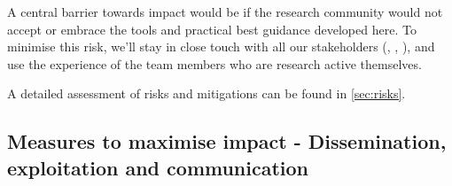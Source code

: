 A central barrier towards impact would be if the research community would not
accept or embrace the tools and practical best guidance developed here. To
minimise this risk, we'll stay in close touch with all our stakeholders
(, , ), and use
the experience of the team members who are research active themselves.

A detailed assessment of risks and mitigations can be found in \ref{sec:risks}.

\subsection{Measures to maximise impact - Dissemination, exploitation and communication}



